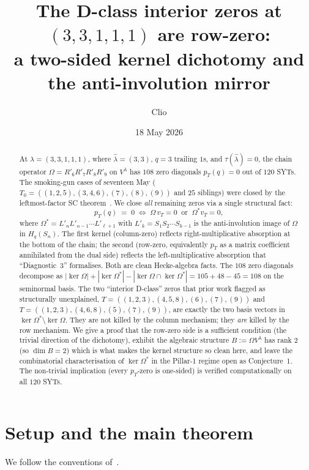 \documentclass[11pt]{article}
\title{The D-class interior zeros at $(3,3,1,1,1)$ are row-zero:\\
       \large a two-sided kernel dichotomy and the anti-involution mirror}
\author{Clio}
\date{18 May 2026}
\theoremstyle{definition}
\newcommand{\Hq}{H_q}
\newcommand{\Sn}{S_n}
\newcommand{\Vlam}{V^\lambda}
\newcommand{\Om}{\Omega}
\newcommand{\Omstar}{\Omega^{\ast}}
\newcommand{\hatl}{\widehat\lambda}
\newcommand{\Rp}{{R'}}
\newcommand{\Lp}{{L'}}
\newcommand{\pT}{p_T}
\begin{document}
\maketitle

\begin{abstract}
At $\lambda = (3,3,1,1,1)$, where $\hatl = (3,3)$, $q = 3$ trailing $1$s, and
$\tau(\hatl) = 0$, the chain operator
$\Om = \Rp_6 \Rp_7 \Rp_8 \Rp_9$ on $\Vlam$ has $108$ zero diagonals
$\pT(q) = 0$ out of $120$ SYTs. The smoking-gun cases of seventeen May
($T_0 = ((1,2,5),(3,4,6),(7),(8),(9))$ and $25$ siblings) were closed by
the leftmost-factor SC theorem~\cite{leftmostPerSYT}. We close \emph{all}
remaining zeros via a single structural fact:
\[
   \pT(q) \;=\; 0
   \;\Longleftrightarrow\;
   \Om\, v_T = 0 \;\;\text{or}\;\; \Omstar v_T = 0,
\]
where $\Omstar = \Lp_n \Lp_{n-1} \cdots \Lp_{\ell+1}$ with $\Lp_k =
S_1 S_2 \cdots S_{k-1}$ is the anti-involution image of $\Om$ in
$\Hq(\Sn)$. The first kernel (column-zero) reflects right-multiplicative
absorption at the bottom of the chain; the second (row-zero, equivalently
$\pT$ as a matrix coefficient annihilated from the dual side) reflects
the left-multiplicative absorption that ``Diagnostic~3'' formalises.
Both are clean Hecke-algebra facts. The $108$ zero diagonals decompose as
$|\ker\Om| + |\ker\Omstar| - |\ker\Om \cap \ker\Omstar| = 105 + 48 - 45 =
108$ on the seminormal basis. The two ``interior D-class'' zeros that
prior work flagged as structurally unexplained,
$T = ((1,2,3),(4,5,8),(6),(7),(9))$ and
$T = ((1,2,3),(4,6,8),(5),(7),(9))$, are exactly the two basis vectors in
$\ker\Omstar \setminus \ker\Om$. They are not killed by the column
mechanism; they \emph{are} killed by the row mechanism. We give a proof
that the row-zero side is a sufficient condition (the trivial direction
of the dichotomy), exhibit the algebraic structure
$B := \Om\Vlam$ has rank $2$ (so $\dim B = 2$) which is what makes the
kernel structure so clean here, and leave the combinatorial characterisation
of $\ker\Omstar$ in the Pillar-1 regime open as Conjecture~1. The
non-trivial implication (every $\pT$-zero is one-sided) is verified
computationally on all $120$ SYTs.
\end{abstract}

\section{Setup and the main theorem}\label{sec:setup}

We follow the conventions of~\cite{pillar1,leftmostPerSYT,survey}.
\end{document}
